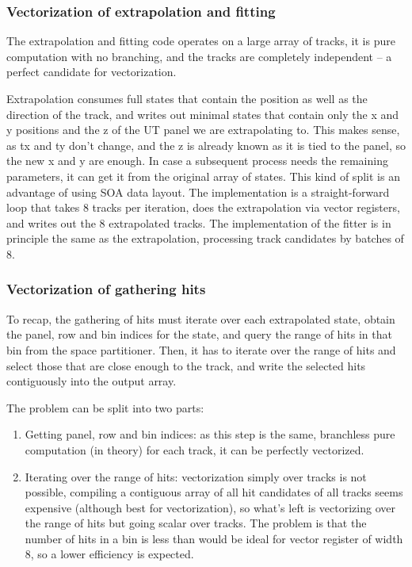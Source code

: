 \documentclass[12pt]{article}
\begin{document}
\subsubsection{Vectorization of extrapolation and fitting}\label{sec_velout_vectorize_extrap_fit}

The extrapolation and fitting code operates on a large array of tracks, it is pure computation with no branching, and the tracks are completely independent -- a perfect candidate for vectorization.

Extrapolation consumes full states that contain the position as well as the direction of the track, and writes out minimal states that contain only the x and y positions and the z of the UT panel we are extrapolating to. This makes sense, as tx and ty don't change, and the z is already known as it is tied to the panel, so the new x and y are enough. In case a subsequent process needs the remaining parameters, it can get it from the original array of states. This kind of split is an advantage of using SOA data layout. The implementation is a straight-forward loop that takes 8 tracks per iteration, does the extrapolation via vector registers, and writes out the 8 extrapolated tracks. The implementation of the fitter is in principle the same as the extrapolation, processing track candidates by batches of 8.


\subsubsection{Vectorization of gathering hits}\label{sec_velout_vectorize_gathering_hits}

To recap, the gathering of hits must iterate over each extrapolated state, obtain the panel, row and bin indices for the state, and query the range of hits in that bin from the space partitioner. Then, it has to iterate over the range of hits and select those that are close enough to the track, and write the selected hits contiguously into the output array.

The problem can be split into two parts:
\begin{enumerate}
	\item Getting panel, row and bin indices: as this step is the same, branchless pure computation (in theory) for each track, it can be perfectly vectorized.
	\item Iterating over the range of hits: vectorization simply over tracks is not possible, compiling a contiguous array of all hit candidates of all tracks seems expensive (although best for vectorization), so what's left is vectorizing over the range of hits but going scalar over tracks. The problem is that the number of hits in a bin is less than would be ideal for vector register of width 8, so a lower efficiency is expected.
\end{enumerate}
\end{document}
